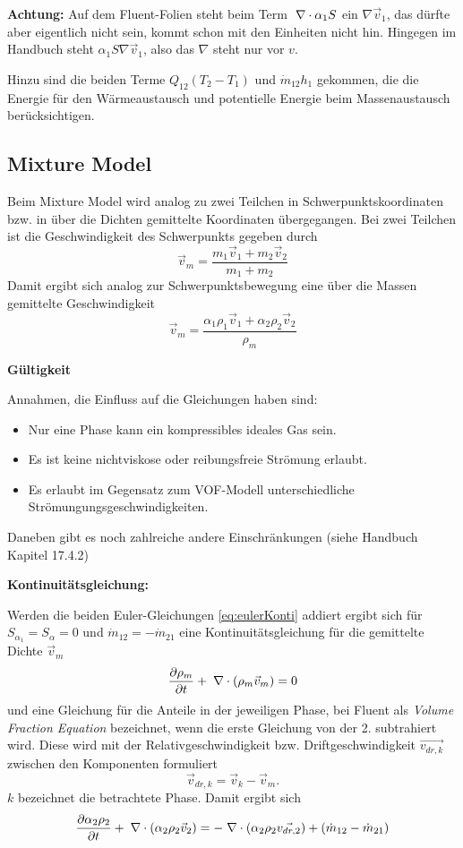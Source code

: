 {\bf Achtung:} Auf dem Fluent-Folien steht beim Term $\;\nabla \cdot \alpha_1
S $ ein $\nabla \vec{v}_1$, das dürfte aber eigentlich nicht sein,
kommt schon mit den Einheiten nicht hin. Hingegen im Handbuch steht
$\alpha_1 S \nabla \vec{v}_1$, also das $\nabla$ steht nur vor $v$.

Hinzu sind die beiden Terme $Q_{12} (T_2-T_1)$ und $\dot{m}_{12} h_1$
gekommen, die die Energie für den Wärmeaustausch und potentielle
Energie beim Massenaustausch berücksichtigen.



\subsection{\bf Mixture Model}

Beim Mixture Model wird analog zu zwei Teilchen in
Schwerpunktskoordinaten bzw. in über die Dichten gemittelte Koordinaten
übergegangen. Bei zwei Teilchen ist die Geschwindigkeit des
Schwerpunkts gegeben durch
\[
\vec{v}_m = \frac{m_1\vec{v}_1+m_2\vec{v}_2}{m_1+m_2}
\]
Damit ergibt sich analog zur Schwerpunktsbewegung eine über die Massen
gemittelte Geschwindigkeit
\[
\vec{v}_m = \frac{\alpha_1\rho_1 \vec{v}_1 + \alpha_2\rho_2 \vec{v}_2}{\rho_m}
\]

{\bf Gültigkeit}

Annahmen, die Einfluss auf die Gleichungen haben sind:
\begin{itemize}
\itemsep 0pt
\item Nur eine Phase kann ein kompressibles ideales Gas sein.
\item Es ist keine nichtviskose oder reibungsfreie Strömung erlaubt.
\item Es erlaubt im Gegensatz zum VOF-Modell unterschiedliche
  Strömungungsgeschwindigkeiten.
\end{itemize}
Daneben gibt es noch zahlreiche andere Einschränkungen (siehe Handbuch
Kapitel 17.4.2)


{\bf Kontinuitätsgleichung:}

Werden die beiden Euler-Gleichungen \ref{eq:eulerKonti} addiert ergibt
sich für $S_{\alpha_1}=S_{\alpha} = 0$ und $ \dot{m}_{12} = -
\dot{m}_{21}$ eine Kontinuitätsgleichung für die gemittelte Dichte
$\vec{v}_m$
\begin{equation}
\frac{\partial \rho_m }{\partial t} + \;\nabla \cdot (\rho_m \vec{v}_m) =
0 \label{eq:fluent-mixed-konti}
\end{equation}
und eine Gleichung für die Anteile in der jeweiligen Phase, bei Fluent
als {\it Volume Fraction Equation} bezeichnet, wenn die erste
Gleichung von der 2. subtrahiert wird. Diese wird mit der
Relativgeschwindigkeit bzw. Driftgeschwindigkeit $\vec{v_{dr,k}}$
zwischen den Komponenten formuliert
\[
\vec{v}_{dr,k} = \vec{v}_{k}-\vec{v}_{m}.
\]
$k$ bezeichnet die betrachtete Phase. Damit ergibt sich
\[
\frac{\partial \alpha_2 \rho_2 }{\partial t} + \;\nabla \cdot (\alpha_2\rho_2
\vec{v}_2) = -\;\nabla \cdot (\alpha_2\rho_2\vec{v_{dr,2}}) + (\dot{m}_{12} -
\dot{m}_{21})
\]

